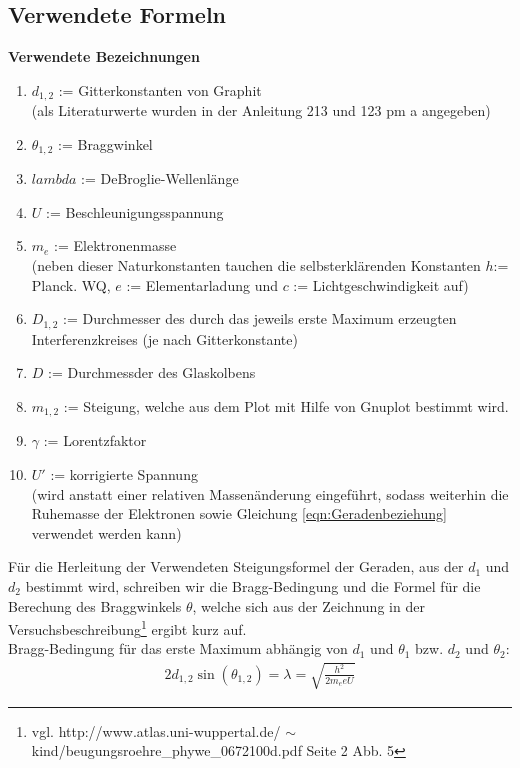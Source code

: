 \documentclass[12pt,a4paper]{article}
\begin{document}
\subsection{Verwendete Formeln}

\textbf{Verwendete Bezeichnungen}
\begin{enumerate}
\item $d_{1,2}$ := Gitterkonstanten von Graphit\\
(als Literaturwerte wurden in der Anleitung 213 und 123 pm a angegeben)
\item $\theta_{1,2}$ := Braggwinkel
\item $lambda$ := DeBroglie-Wellenlänge
\item $U$ := Beschleunigungsspannung
\item $m_e$ := Elektronenmasse\\
(neben dieser Naturkonstanten tauchen die selbsterklärenden Konstanten $h$:= Planck. WQ, $e$ := Elementarladung und $c$ := Lichtgeschwindigkeit auf)
\item $D_{1,2}$ := Durchmesser des durch das jeweils erste Maximum erzeugten Interferenzkreises (je nach Gitterkonstante)
\item $D$ := Durchmessder des Glaskolbens
\item $m_{1,2}$ := Steigung, welche aus dem Plot mit Hilfe von Gnuplot bestimmt wird.
\item $\gamma$ := Lorentzfaktor
\item $U'$ := korrigierte Spannung\\
(wird anstatt einer relativen Massenänderung eingeführt, sodass weiterhin die Ruhemasse der Elektronen sowie Gleichung \ref{eqn:Geradenbeziehung} verwendet werden kann)
\end{enumerate}
Für die Herleitung der Verwendeten Steigungsformel der Geraden, aus der $d_1$ und $d_2$ bestimmt wird, schreiben wir die Bragg-Bedingung und die Formel für die Berechung des Braggwinkels $\theta$, welche sich aus der Zeichnung in der Versuchsbeschreibung\footnote{vgl. http://www.atlas.uni-wuppertal.de/
$\sim$kind/beugungsroehre\_phywe\_0672100d.pdf Seite 2 Abb. 5} ergibt kurz auf.\\
Bragg-Bedingung für das erste Maximum abhängig von $d_1$ und $\theta_1$ bzw. $d_2$ und $\theta_2$:
\begin{align}
2d_{1,2}\sin(\theta_{1,2}) = \lambda =
\sqrt{\frac{h^2}{2m_eeU}}
\end{align}
\end{document}
